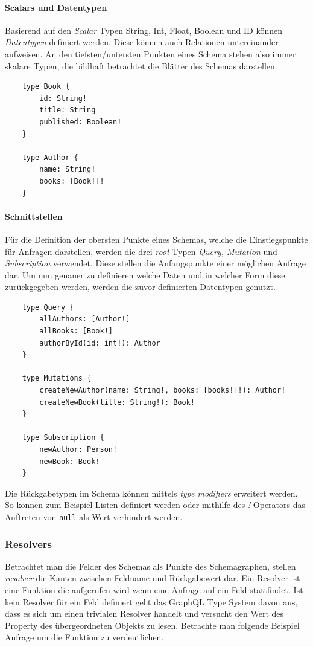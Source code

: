 \documentclass[11pt]{article}
\begin{document}
\paragraph{Scalars und Datentypen}
Basierend auf den \textit{Scalar} Typen String, Int, Float, Boolean und ID können \textit{Datentypen} definiert werden. Diese können auch Relationen untereinander aufweisen. An den tiefsten/untersten Punkten eines Schema stehen also immer skalare Typen, die bildhaft betrachtet die Blätter des Schemas darstellen.

\begin{verbatim}
	type Book {
	 	id: String!
		title: String
		published: Boolean!
	}

	type Author {
		name: String!
		books: [Book!]!
	}
\end{verbatim}

\paragraph{Schnittstellen}
Für die Definition der obersten Punkte eines Schemas, welche die Einstiegspunkte für Anfragen darstellen, werden die drei \textit{root} Typen  \textit{Query, Mutation} und  \textit{Subscription} verwendet. Diese stellen die Anfangspunkte einer möglichen Anfrage dar. Um nun genauer zu definieren welche Daten und in welcher Form diese zurückgegeben werden, werden die zuvor definierten Datentypen genutzt. 

\begin{verbatim}
	type Query {
		allAuthors: [Author!]
		allBooks: [Book!]
		authorById(id: int!): Author
	}

	type Mutations {
		createNewAuthor(name: String!, books: [books!]!): Author!
		createNewBook(title: String!): Book!
	}

	type Subscription {
		newAuthor: Person!
		newBook: Book!
	}

\end{verbatim}

Die Rückgabetypen im Schema können mittels \textit{type modifiers} erweitert werden. So können zum Beispiel Listen definiert werden oder mithilfe des \textit{!}-Operators das Auftreten von \texttt{null} als Wert verhindert werden.


\subsubsection{Resolvers}
Betrachtet man die Felder des Schemas als Punkte des Schemagraphen, stellen \textit{resolver} die Kanten zwischen Feldname und Rückgabewert dar. Ein Resolver ist eine Funktion die aufgerufen wird wenn eine Anfrage auf ein Feld stattfindet. Ist kein Resolver für ein Feld definiert geht das GraphQL Type System davon aus, dass es sich um einen trivialen Resolver handelt und versucht den Wert des Property des übergeordneten Objekts zu lesen. Betrachte man folgende Beispiel Anfrage um die Funktion zu verdeutlichen.
\end{document}
